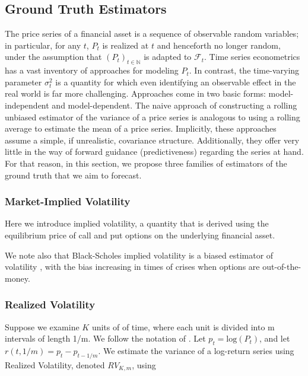 \documentclass[11pt]{article}
\def\mc#1{\mathcal{#1}} %
\def\mc#1{\mathcal{#1}}
\theoremstyle{definition}
\begin{document}
    \subsection{Ground Truth Estimators}
    \label{Ground Truth Estimators}
    
    The price series of a financial asset is a sequence of observable random variables; in particular, for any $t$, $P_{t}$ is realized at $t$ and henceforth no longer random, under the assumption that $(P_{t})_{t\in\mathbb{N}}$ is adapted to $\mc{F}_{t}$.  Time series econometrics has a vast inventory of approaches for modeling $P_{t}$.  In contrast, the time-varying parameter $\sigma^{2}_{t}$ is a quantity for which even identifying an observable effect in the real world is far more challenging.  Approaches come in two basic forms: model-independent and model-dependent.  The naive approach of constructing a rolling unbiased estimator of the variance of a price series is analogous to using a rolling average to estimate the mean of a price series.  Implicitly, these approaches assume a simple, if unrealistic, covariance structure.  Additionally, they offer very little in the way of forward guidance (predictiveness) regarding the series at hand.  For that reason, in this section, we propose three families of estimators of the ground truth that we aim to forecast.
    
    \subsubsection{Market-Implied Volatility}
    
    Here we introduce implied volatility, a quantity that is derived using the equilibrium price of call and put options on the underlying financial asset.
    
    We note also that Black-Scholes implied volatility is a biased estimator of volatility \citep{mayhew1995implied, christensen1998relation}, with the bias increasing in times of crises when options are out-of-the-money.
    
    \subsubsection{Realized Volatility}
    
    Suppose we examine $K$ units of of time, where each unit is divided into m intervals of length 1/m.  We follow the notation of  \citet{andersen2009realized}. Let $p_{t} = \text{log}(P_{t})$, and let $r(t, 1/m) = p_{t} - p_{t-1/m}$.  We estimate the variance of a log-return series using Realized Volatility, denoted $RV_{K,m}$, using
    
\end{document}
